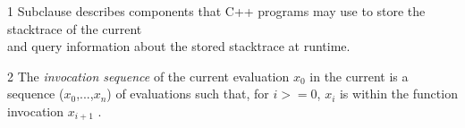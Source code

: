 

1 Subclause  describes components that C++ programs may use to
store the stacktrace of the current \\
and query information about the stored stacktrace at runtime.

2 The \emph{invocation sequence} of the current evaluation $x_0$
in the current  is a sequence
($x_0$,...,$x_n$) of evaluations such that, for $i >= 0$,
$x_i$ is within the function invocation $x_{i+1}$ .


